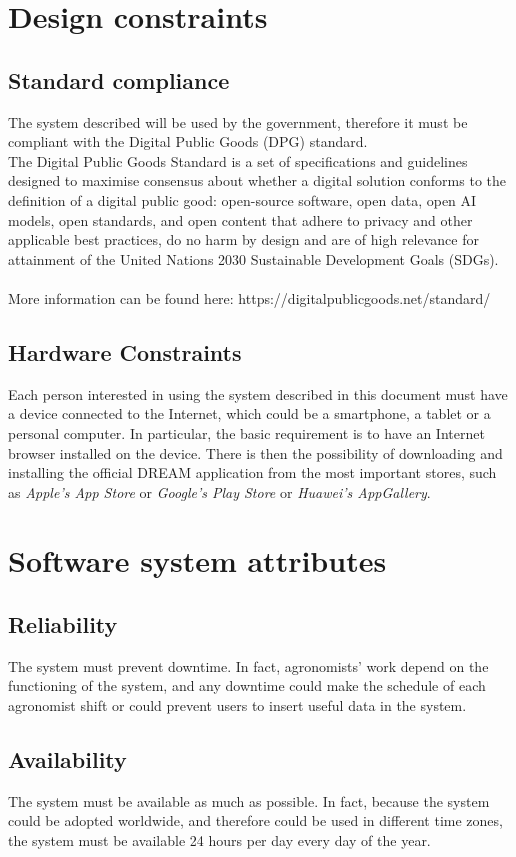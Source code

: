 \documentclass[10pt]{report}
\begin{document}
\section{Design constraints}
\subsection{Standard compliance}
The system described will be used by the government, therefore it must be compliant with the Digital Public Goods (DPG) standard.\\
The Digital Public Goods Standard is a set of specifications and guidelines designed to maximise consensus about whether a digital solution conforms to the definition of a digital public good: open-source software, open data, open AI models, open standards, and open content that adhere to privacy and other applicable best practices, do no harm by design and are of high relevance for attainment of the United Nations 2030 Sustainable Development Goals (SDGs).\\ \\
More information can be found here: https://digitalpublicgoods.net/standard/
\subsection{Hardware Constraints}
Each person interested in using the system described in this document must have a device connected to the Internet, which could be a smartphone, a tablet or a personal computer. In particular, the basic requirement is to have an Internet browser installed on the device. There is then the possibility of downloading and installing the official DREAM application from the most important stores, such as \emph{Apple’s App Store} or \emph{Google’s Play Store} or \emph{Huawei's AppGallery}.
\section{Software system attributes}
\subsection{Reliability}
The system must prevent downtime. In fact, agronomists' work depend on the functioning of the system, and any downtime could make the schedule of each agronomist shift or could prevent users to insert useful data in the system.
\subsection{Availability}
The system must be available as much as possible. In fact, because the system could be adopted worldwide, and therefore could be used in different time zones, the system must be available 24 hours per day every day of the year.
\end{document}
